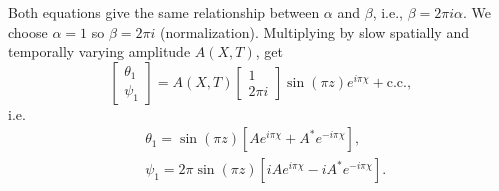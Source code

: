 \documentclass{article}
\begin{document}
%
Both equations give the same relationship between $\alpha$ and $\beta$, i.e., $\beta = 2\pi i \alpha$. 
%
We choose $\alpha = 1$ so $\beta = 2\pi i$ (normalization). Multiplying by slow spatially and temporally varying amplitude $A(X, T)$, get
\begin{equation}\label{eq:order_1_soln}
 \begin{bmatrix}
  \theta_{1} \\
 \psi_{1}
 \end{bmatrix} =
 A(X, T)
 \begin{bmatrix}
  1 \\
 2\pi i
 \end{bmatrix}
 \sin{(\pi z)} e^{i\pi \chi} + \textrm{c.c.,}
\end{equation}
i.e.
\begin{align}
&\boxed{ \theta_{1} = \sin{(\pi z)}\left[A e^{i \pi \chi} + A^{*} e^{-i \pi \chi} \right],} \\
%
&\boxed{ \psi_{1} =  2 \pi \sin{(\pi z)}\left[i A e^{i \pi \chi} - i A^{*} e^{-i \pi \chi} \right] .}
\end{align}
\end{document}
